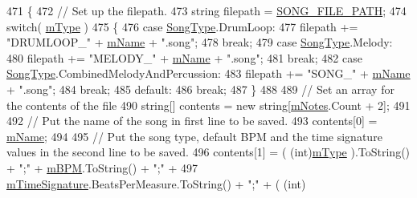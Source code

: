 \begin{DoxyCode}
471     \{
472         \textcolor{comment}{// Set up the filepath.}
473         \textcolor{keywordtype}{string} filepath = \hyperlink{group___song_const_ga95247572cf734f9e8b35973de4eeb1a4}{SONG\_FILE\_PATH};
474         \textcolor{keywordflow}{switch}( \hyperlink{group___song_priv_var_gaf3b9d0f461522324f897b746311b43c5}{mType} )
475         \{
476             \textcolor{keywordflow}{case} \hyperlink{group___song_enums_gae681a1f001333e39fc1cb4fea97bfe1b}{SongType}.DrumLoop:
477                 filepath += \textcolor{stringliteral}{"DRUMLOOP\_"} + \hyperlink{group___song_priv_var_ga6a5e6c1e4aa92939e2b5c1e3d9908df8}{mName} + \textcolor{stringliteral}{".song"};
478                 \textcolor{keywordflow}{break};
479             \textcolor{keywordflow}{case} \hyperlink{group___song_enums_gae681a1f001333e39fc1cb4fea97bfe1b}{SongType}.Melody:
480                 filepath += \textcolor{stringliteral}{"MELODY\_"} + \hyperlink{group___song_priv_var_ga6a5e6c1e4aa92939e2b5c1e3d9908df8}{mName} + \textcolor{stringliteral}{".song"};
481                 \textcolor{keywordflow}{break};
482             \textcolor{keywordflow}{case} \hyperlink{group___song_enums_gae681a1f001333e39fc1cb4fea97bfe1b}{SongType}.CombinedMelodyAndPercussion:
483                 filepath += \textcolor{stringliteral}{"SONG\_"} + \hyperlink{group___song_priv_var_ga6a5e6c1e4aa92939e2b5c1e3d9908df8}{mName} + \textcolor{stringliteral}{".song"};
484                 \textcolor{keywordflow}{break};
485             \textcolor{keywordflow}{default}:
486                 \textcolor{keywordflow}{break};
487         \}
488 
489         \textcolor{comment}{// Set an array for the contents of the file}
490         \textcolor{keywordtype}{string}[] contents = \textcolor{keyword}{new} \textcolor{keywordtype}{string}[\hyperlink{group___song_priv_var_ga674bc904a1f856d485d5fb7fe84bac85}{mNotes}.Count + 2];
491 
492         \textcolor{comment}{// Put the name of the song in first line to be saved.}
493         contents[0] = \hyperlink{group___song_priv_var_ga6a5e6c1e4aa92939e2b5c1e3d9908df8}{mName};
494 
495         \textcolor{comment}{// Put the song type, default BPM and the time signature values in the second line to be saved.}
496         contents[1] = ( (int)\hyperlink{group___song_priv_var_gaf3b9d0f461522324f897b746311b43c5}{mType} ).ToString() + \textcolor{stringliteral}{";"} + \hyperlink{group___song_priv_var_ga3341fbbd9c0c58fe6514623e6b6c5a1e}{mBPM}.ToString() + \textcolor{stringliteral}{";"} +
497             \hyperlink{group___song_priv_var_ga2b2dcc0e83e49f7303b6a1371877b25e}{mTimeSignature}.BeatsPerMeasure.ToString() + \textcolor{stringliteral}{";"} + ( (int)

\end{DoxyCode}
